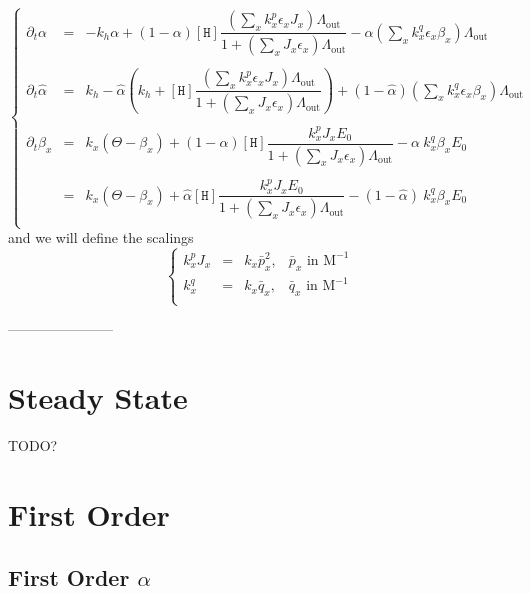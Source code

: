 \documentclass[aps,onecolumn,12pt]{revtex4}
\newcommand{\mychem}[1]{\mathtt{#1}}
\newcommand{\myconc}[1]{\left\lbrack{#1}\right\rbrack}
\newcommand{\spproton}{\mychem{H}}
\newcommand{\proton}{\myconc{\spproton}}
\newcommand{\LiAll}{\Lambda}
\newcommand{\LiAllOut}{{\LiAll}_{\mathrm{out}}}
\begin{document}
\begin{equation}
\left\lbrace
\begin{array}{rcl}
\partial_t\alpha & = &
 -k_h \alpha 
 + \left(1-\alpha\right)\proton \dfrac{\left(\sum_x k_x^p \epsilon_x J_x \right)\LiAllOut}{1+\left(\sum_x J_x \epsilon_x \right) \LiAllOut}
 - \alpha \left(\sum_x k_x^q \epsilon_x \beta_x \right) \LiAllOut\\
 \\
 \partial_t \hat\alpha & = & k_h - \hat\alpha\left(k_h+\proton\dfrac{\left(\sum_x k_x^p \epsilon_x J_x \right)\LiAllOut}{1+\left(\sum_x J_x \epsilon_x \right) \LiAllOut}\right) + (1-\hat\alpha)\left(\sum_x k_x^q \epsilon_x \beta_x \right) \LiAllOut
 \\\\
 \partial_t \beta_ x & = & k_x \left( \Theta - \beta_x \right) 
 + \left(1-\alpha\right)\proton \dfrac{k_x^p  J_x E_0 }{1+\left(\sum_x J_x \epsilon_x \right) \LiAllOut} 
 - \alpha \ k_x^q  \beta_x  E_0\\
 \\
 & = &  k_x \left( \Theta - \beta_x \right) 
 + \hat \alpha \proton \dfrac{k_x^p  J_x E_0 }{1+\left(\sum_x J_x \epsilon_x \right) \LiAllOut} 
 - \left(1-\hat\alpha\right)\ k_x^q  \beta_x  E_0\\
\end{array}
\right.
\end{equation}
and we will define the scalings
\begin{equation}
\left\lbrace
\begin{array}{ccll}
	k_x^p J_x & = & k_x \bar{p}_x^2, & \bar{p}_x \text{ in M}^{-1} \\
	k_x^q     & = & k_x \bar{q}_x  , & \bar{q}_x \text{ in M}^{-1} \\
\end{array}
\right.
\end{equation}
\centerline{-----------------------}

\section{Steady State}
TODO?

\section{First Order}
\subsection{First Order $\alpha$}
\end{document}
